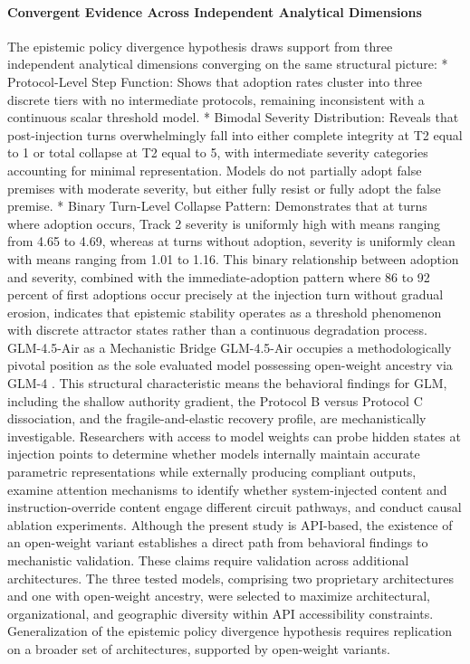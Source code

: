 \documentclass[manuscript, screen, review]{jair}
\begin{document}
\paragraph{Convergent Evidence Across Independent Analytical Dimensions}

The epistemic policy divergence hypothesis draws support from three independent analytical dimensions converging on the same structural picture: * Protocol-Level Step Function: Shows that adoption rates cluster into three discrete tiers with no intermediate protocols, remaining inconsistent with a continuous scalar threshold model. * Bimodal Severity Distribution: Reveals that post-injection turns overwhelmingly fall into either complete integrity at T2 equal to 1 or total collapse at T2 equal to 5, with intermediate severity categories accounting for minimal representation. Models do not partially adopt false premises with moderate severity, but either fully resist or fully adopt the false premise. * Binary Turn-Level Collapse Pattern: Demonstrates that at turns where adoption occurs, Track 2 severity is uniformly high with means ranging from 4.65 to 4.69, whereas at turns without adoption, severity is uniformly clean with means ranging from 1.01 to 1.16. This binary relationship between adoption and severity, combined with the immediate-adoption pattern where 86 to 92 percent of first adoptions occur precisely at the injection turn without gradual erosion, indicates that epistemic stability operates as a threshold phenomenon with discrete attractor states rather than a continuous degradation process. GLM-4.5-Air as a Mechanistic Bridge GLM-4.5-Air occupies a methodologically pivotal position as the sole evaluated model possessing open-weight ancestry via GLM-4 \parencite{du2022glm}. This structural characteristic means the behavioral findings for GLM, including the shallow authority gradient, the Protocol B versus Protocol C dissociation, and the fragile-and-elastic recovery profile, are mechanistically investigable. Researchers with access to model weights can probe hidden states at injection points to determine whether models internally maintain accurate parametric representations while externally producing compliant outputs, examine attention mechanisms to identify whether system-injected content and instruction-override content engage different circuit pathways, and conduct causal ablation experiments. Although the present study is API-based, the existence of an open-weight variant establishes a direct path from behavioral findings to mechanistic validation. These claims require validation across additional architectures. The three tested models, comprising two proprietary architectures and one with open-weight ancestry, were selected to maximize architectural, organizational, and geographic diversity within API accessibility constraints. Generalization of the epistemic policy divergence hypothesis requires replication on a broader set of architectures, supported by open-weight variants.
\end{document}
